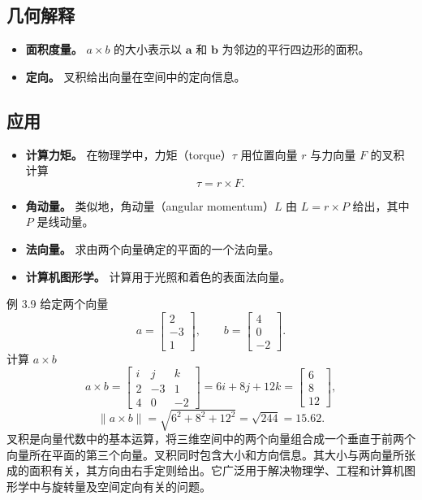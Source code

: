 \subsection{几何解释}
\begin{itemize}
\item \textbf{面积度量。} $a\times b$ 的大小表示以 $\symbf{a}$ 和 $\symbf{b}$ 为邻边的平行四边形的面积。
\item \textbf{定向。} 叉积给出向量在空间中的定向信息。
\end{itemize}

\subsection{应用}
\begin{itemize}
\item \textbf{计算力矩。} 在物理学中，力矩（torque）$\tau$ 用位置向量 $r$ 与力向量 $F$ 的叉积计算
\[
  \tau=r\times F.
\]
\item \textbf{角动量。} 类似地，角动量（angular momentum）$L$ 由 $L=r\times P$ 给出，其中 $P$ 是线动量。
\item \textbf{法向量。} 求由两个向量确定的平面的一个法向量。
\item \textbf{计算机图形学。} 计算用于光照和着色的表面法向量。
\end{itemize}

\begin{statement}{例 3.9}{}
给定两个向量
\[
  a=\begin{bmatrix}2\\-3\\1\end{bmatrix},\qquad
  b=\begin{bmatrix}4\\0\\-2\end{bmatrix}.
\]
计算 $a\times b$
\[
  a\times b=\begin{bmatrix}i&j&k\\2&-3&1\\4&0&-2\end{bmatrix}
    =6i+8j+12k=\begin{bmatrix}6\\8\\12\end{bmatrix},
\]
\[
  \lVert a\times b\rVert=\sqrt{6^2+8^2+12^2}=\sqrt{244}=15.62.
\]
叉积是向量代数中的基本运算，将三维空间中的两个向量组合成一个垂直于前两个向量所在平面的第三个向量。叉积同时包含大小和方向信息。其大小与两向量所张成的面积有关，其方向由右手定则给出。它广泛用于解决物理学、工程和计算机图形学中与旋转量及空间定向有关的问题。
\end{statement}

